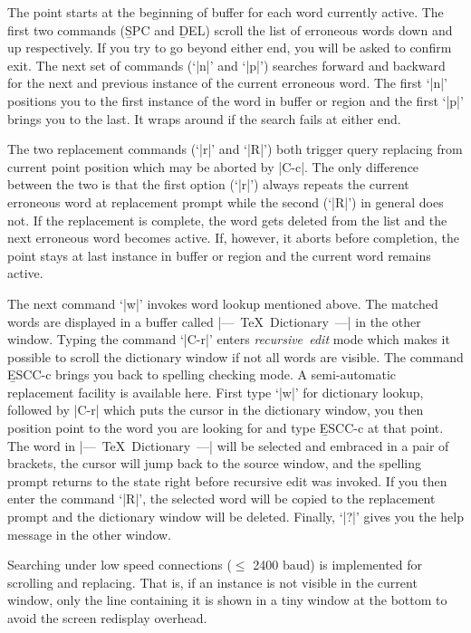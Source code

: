 {\begin{env}
\begin{minipage}
The point starts at the beginning of buffer for each word currently active.
The first two commands ({\b SPC} and {\b DEL}) scroll the list of erroneous
words down and up respectively.  If you try to go beyond either end, you will
be asked to confirm exit.  
The next set of commands (`|n|' and `|p|') searches forward and backward for
the next and previous instance of the current erroneous word.
The first `|n|' positions you to the first instance of the word in buffer
or region and the first `|p|' brings you to the last.
It wraps around if the search fails at either end.

The two replacement commands (`|r|' and `|R|')
both trigger query replacing from current point position
which may be aborted by |C-c|.  The only difference between the two is that
the first option (`|r|') always repeats the current erroneous
word at replacement prompt while the second (`|R|') in general does not.
If the replacement is complete, the word gets deleted from
the list and the next erroneous word becomes active.  If, however, it aborts
before completion, the point stays at last instance in buffer or region
and the current word remains active.

The next command `|w|' invokes word lookup mentioned above.
The matched words are displayed in  a buffer called
\hbox{|--- TeX Dictionary ---|} in the other window.
Typing the command `|C-r|' enters \hbox{\it recursive edit\/} mode which makes
it possible to scroll the dictionary window if not all words are visible.
The command {\b ESC{\s}C-c} brings you back to spelling checking mode.
A semi-automatic replacement facility is available here.  First type
`|w|' for dictionary lookup, followed by |C-r| which puts the cursor
in the dictionary window, you then position point to the word you are looking 
for and type {\b ESC{\s}C-c} at that point.  The word in
\hbox{|--- TeX Dictionary ---|}
will be selected and embraced in a pair of brackets, the cursor will jump back 
to the source window, and the spelling prompt returns to the state right before
recursive edit was invoked.  If you then enter the command `|R|',
the selected word will be copied to the replacement prompt and
the dictionary window will be deleted.
Finally, `|?|' gives you the help message in the other window.

Searching under low speed connections ($\leq$ 2400 baud) is implemented
for scrolling and replacing.  That is, if an instance is not visible in the
current window, only the line containing it is shown in a tiny window at 
the bottom to avoid the screen redisplay overhead.



\end{minipage}
\end{env}}
